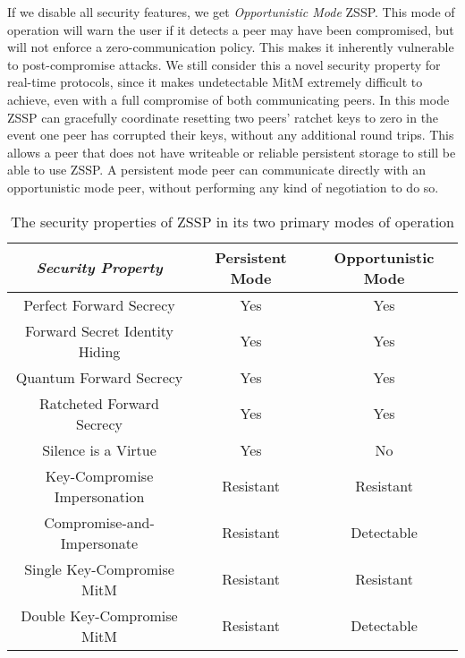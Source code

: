 \documentclass{article}
\begin{document}
If we disable all security features, we get \emph{Opportunistic Mode} ZSSP. This mode of operation will warn the user if it detects a peer may have been compromised, but will not enforce a zero-communication policy. This makes it inherently vulnerable to post-compromise attacks. We still consider this a novel security property for real-time protocols, since it makes undetectable MitM extremely difficult to achieve, even with a full compromise of both communicating peers. In this mode ZSSP can gracefully coordinate resetting two peers' ratchet keys to zero in the event one peer has corrupted their keys, without any additional round trips. This allows a peer that does not have writeable or reliable persistent storage to still be able to use ZSSP. A persistent mode peer can communicate directly with an opportunistic mode peer, without performing any kind of negotiation to do so.

\begin{table}[!ht]
	\renewcommand{\arraystretch}{1.3}
	\caption{The security properties of ZSSP in its two primary modes of operation}\label{table:security_prop}
	\centering
	\begin{tabular}{ | c | c | c | }
		\hline
		\textit{Security Property} & Persistent Mode & Opportunistic Mode \\
		\hline
		\hline
		Perfect Forward Secrecy & \color{BlueViolet} Yes & \color{BlueViolet} Yes \\
		\hline
		Forward Secret Identity Hiding & \color{BlueViolet} \color{BlueViolet} Yes & \color{BlueViolet} Yes \\
		\hline
		Quantum Forward Secrecy & \color{BlueViolet} Yes & \color{BlueViolet} Yes \\
		\hline
		Ratcheted Forward Secrecy & \color{BlueViolet} Yes & \color{BlueViolet} Yes \\
		\hline
		Silence is a Virtue & \color{BlueViolet} Yes & \color{Red} No  \\
		\hline
		Key-Compromise Impersonation & \color{BlueViolet} Resistant & \color{BlueViolet} Resistant \\
		\hline
		Compromise-and-Impersonate & \color{BlueViolet} Resistant & \color{Maroon} Detectable \\
		\hline
		Single Key-Compromise MitM & \color{BlueViolet} Resistant & \color{BlueViolet} Resistant \\
		\hline
		Double Key-Compromise MitM & \color{BlueViolet} Resistant & \color{Maroon} Detectable \\
		\hline
	\end{tabular}
\end{table}
\end{document}
